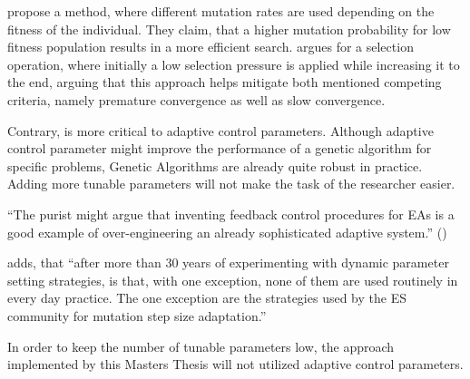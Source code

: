 \cite{marsili_libelli_adaptive_2000} propose a method, where different mutation rates are used depending on the fitness of the individual. They claim, that a higher mutation probability for low fitness population results in a more efficient search. \cite{hussain_trade-off_2020} argues for a selection operation, where initially a low selection pressure is applied while increasing it to the end, arguing that this approach helps mitigate both mentioned competing criteria, namely premature convergence as well as slow convergence.

Contrary, \cite{kacprzyk_parameter_2007} is more critical to adaptive control parameters. Although adaptive control parameter might improve the performance of a genetic algorithm for specific problems, Genetic Algorithms are already quite robust in practice. Adding more tunable parameters will not make the task of the researcher easier.

\enquote{The purist might argue that inventing feedback control procedures for EAs is a good example of over-engineering an already sophisticated adaptive system.} (\cite{kacprzyk_parameter_2007})

\cite{kacprzyk_parameter_2007} adds, that \enquote{after more than 30 years of experimenting with dynamic parameter setting strategies, is that, with one exception, none of them are used routinely in every day practice. The one exception are the strategies used by the ES community for mutation step size adaptation.}

In order to keep the number of tunable parameters low, the approach implemented by this Masters Thesis will not utilized adaptive control parameters.
